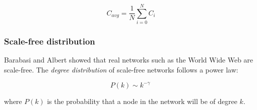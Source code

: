 \documentclass[a4paper,11pt,titlepage]{article}
\begin{document}
\[ \ C_{avg} = \frac{1}{N}\sum_{i=0}^{N} C_i \]

\subsubsection{Scale-free distribution}

Barabasi and Albert showed that real networks such as the World Wide Web are
scale-free. The \emph{degree distribution} of scale-free networks follows a
power law:

\[ P(k) \sim k^{-\gamma} \]

where $P(k)$ is the probability that a node in the network will be of degree $k$.








\end{document}
